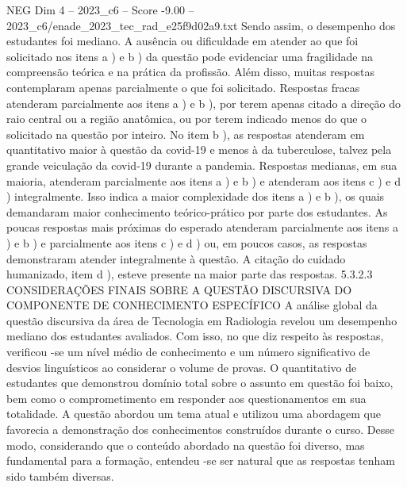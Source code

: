 \begin{textsample}{NEG Dim 4 – 2023\_c6 – Score -9.00 – 2023\_c6/enade\_2023\_tec\_rad\_e25f9d02a9.txt}
Sendo assim, o desempenho dos estudantes foi mediano.
A ausência ou dificuldade em atender ao que foi solicitado nos itens a ) e b ) da questão pode evidenciar uma fragilidade na compreensão teórica e na prática da profissão.
Além disso, muitas respostas contemplaram apenas parcialmente o que foi solicitado.
Respostas fracas atenderam parcialmente aos itens a ) e b ), por terem apenas citado a direção do raio central ou a região anatômica, ou por terem indicado menos do que o solicitado na questão por inteiro.
No item b ), as respostas atenderam em quantitativo maior à questão da covid-19 e menos à da tuberculose, talvez pela grande veiculação da covid-19 durante a pandemia.
Respostas medianas, em sua maioria, atenderam parcialmente aos itens a ) e b ) e atenderam aos itens c ) e d ) integralmente.
Isso indica a maior complexidade dos itens a ) e b ), os quais demandaram maior conhecimento teórico-prático por parte dos estudantes.
As poucas respostas mais próximas do esperado atenderam parcialmente aos itens a ) e b ) e parcialmente aos itens c ) e d ) ou, em poucos casos, as respostas demonstraram atender integralmente à questão.
A citação do cuidado humanizado, item d ), esteve presente na maior parte das respostas. 5.3.2.3 CONSIDERAÇÕES FINAIS SOBRE A QUESTÃO DISCURSIVA DO COMPONENTE DE CONHECIMENTO ESPECÍFICO A análise global da questão discursiva da área de Tecnologia em Radiologia revelou um desempenho mediano dos estudantes avaliados.
Com isso, no que diz respeito às respostas, verificou -se um nível médio de conhecimento e um número significativo de desvios linguísticos ao considerar o volume de provas.
O quantitativo de estudantes que demonstrou domínio total sobre o assunto em questão foi baixo, bem como o comprometimento em responder aos questionamentos em sua totalidade.
A questão abordou um tema atual e utilizou uma abordagem que favorecia a demonstração dos conhecimentos construídos durante o curso.
Desse modo, considerando que o conteúdo abordado na questão foi diverso, mas fundamental para a formação, entendeu -se ser natural que as respostas tenham sido também diversas.

\end{textsample}
